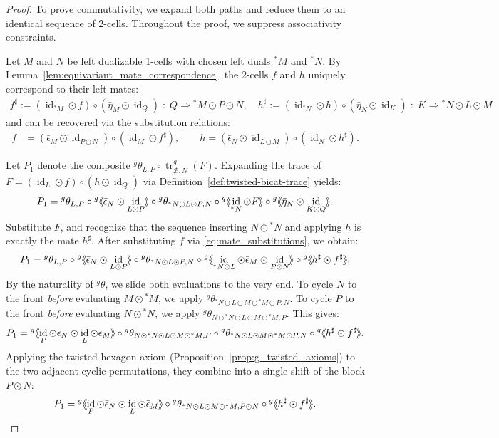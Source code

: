 \documentclass[11pt,oneside]{amsart}
\DeclareMathOperator{\id}{id}
\numberwithin{equation}{section}
\numberwithin{figure}{section}
\theoremstyle{plain}
\theoremstyle{definition}
\theoremstyle{remark}
\newcommand{\shspace}{\hspace{.5mm}} %
\newcommand{\sh}[1]{{\ensuremath{\shspace\hspace{1mm}\makebox[-1mm]{$\langle$}\makebox[0mm]{$\langle$}\hspace{1mm}{#1}\makebox[1mm]{$\rangle$}\makebox[0mm]{$\rangle$}\shspace}}}
\begin{document}
\begin{proof} 
To prove commutativity, we expand both paths and reduce them to an identical sequence of 2-cells. Throughout the proof, we suppress associativity constraints.

Let $M$ and $N$ be left dualizable 1-cells  with chosen left duals ${}^*M$ and ${}^*N$. By Lemma~\ref{lem:equivariant_mate_correspondence}, the 2-cells $f$ and $h$ uniquely correspond to their left mates:
\begin{align*}
f^\sharp := (\id_{{}^*M} \odot f) \circ (\bar{\eta}_M \odot \id_Q) \;\colon\; Q \Rightarrow {}^*M \odot P \odot N, \quad
h^\sharp := (\id_{{}^*N} \odot h) \circ (\bar{\eta}_N \odot \id_K) \;\colon\; K \Rightarrow {}^*N \odot L \odot M
\end{align*}
and can be recovered via the substitution relations:
\begin{equation}\label{eq:mate_substitutions}
\begin{aligned}
f &= (\bar{\epsilon}_M \odot \id_{P \odot N}) \circ (\id_M \odot f^\sharp), \quad
\quad h = (\bar{\epsilon}_N \odot \id_{L \odot M}) \circ (\id_N \odot h^\sharp).
\end{aligned}
\end{equation}

 
Let $P_1$ denote the composite ${}^g\theta_{L,P} \circ \operatorname{tr}_{\mathcal{B},N}^g(F)$. Expanding the trace of $F = (\id_L \odot f) \circ (h \odot \id_Q)$ via Definition~\ref{def:twisted-bicat-trace} yields:
\[
P_1 = {}^g\theta_{L,P} \circ {}^g\sh{\bar{\epsilon}_N \odot \id_{L \odot P}} \circ {}^g\theta_{{}^*N \odot L \odot P, N} \circ {}^g\sh{\id_{{}^*N} \odot F} \circ {}^g\sh{\bar{\eta}_N \odot \id_{K \odot Q}}.
\]
Substitute $F$, and recognize that the sequence inserting $N \odot {}^*N$ and applying $h$ is exactly the mate $h^\sharp$. After substituting $f$ via \eqref{eq:mate_substitutions}, we obtain:
\[
P_1 = {}^g\theta_{L,P} \circ {}^g\sh{\bar{\epsilon}_N \odot \id_{L \odot P}} \circ {}^g\theta_{{}^*N \odot L \odot P, N} \circ {}^g\sh{\id_{{}^*N \odot L} \odot \bar{\epsilon}_M \odot \id_{P \odot N}} \circ {}^g\sh{h^\sharp \odot f^\sharp}.
\]
By the naturality of ${}^g\theta$, we slide both evaluations to the very end. To cycle $N$ to the front \emph{before} evaluating $M \odot {}^*M$, we apply ${}^g\theta_{{}^*N \odot L \odot M \odot {}^*M \odot P, N}$. To cycle $P$ to the front \emph{before} evaluating $N \odot {}^*N$, we apply ${}^g\theta_{N \odot {}^*N \odot L \odot M \odot {}^*M, P}$. This gives:
\[
P_1 = {}^g\sh{\id_P \odot \bar{\epsilon}_N \odot \id_L \odot \bar{\epsilon}_M} \circ {}^g\theta_{N \odot {}^*N \odot L \odot M \odot {}^*M, P} \circ {}^g\theta_{{}^*N \odot L \odot M \odot {}^*M \odot P, N} \circ {}^g\sh{h^\sharp \odot f^\sharp}.
\]
Applying the twisted hexagon axiom (Proposition~\ref{prop:g_twisted_axioms}) to the two adjacent cyclic permutations, they combine into a single shift of the block $P \odot N$:
\begin{equation}\label{eq:path1_abstract}
P_1 = {}^g\sh{\id_P \odot \bar{\epsilon}_N \odot \id_L \odot \bar{\epsilon}_M} \circ {}^g\theta_{{}^*N \odot L \odot M \odot {}^*M, P \odot N} \circ {}^g\sh{h^\sharp \odot f^\sharp}.
\end{equation}


\end{proof}
\end{document}
